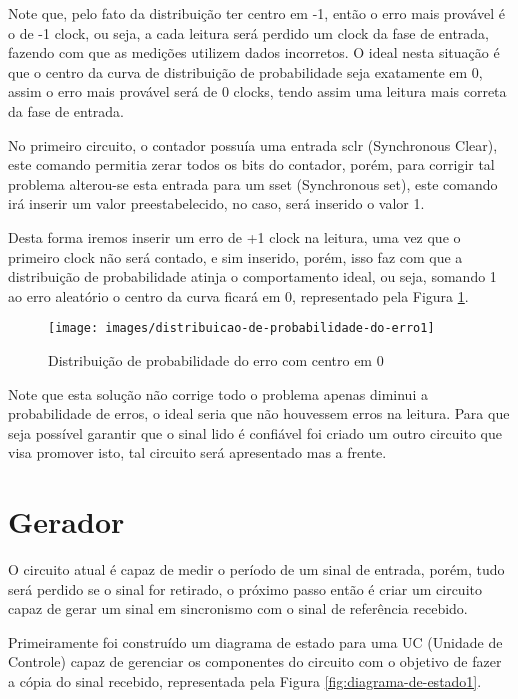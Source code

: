 \documentclass[12pt,a4paper,openany]{abntex2}
\begin{document}
Note que, pelo fato da distribuição ter centro em -1, então o erro mais provável é o de -1 clock, ou seja, a cada leitura será perdido um clock da fase de entrada, fazendo com que as medições utilizem dados incorretos. O ideal nesta situação é que o centro da curva de distribuição de probabilidade seja exatamente em 0, assim o erro mais provável será de 0 clocks, tendo assim uma leitura mais correta da fase de entrada.

No primeiro circuito, o contador possuía uma entrada sclr (Synchronous Clear), este comando permitia zerar todos os bits do contador, porém, para corrigir tal problema alterou-se esta entrada para um sset (Synchronous set), este comando irá inserir um valor preestabelecido, no caso, será inserido o valor 1.

Desta forma iremos inserir um erro de +1 clock na leitura, uma vez que o primeiro clock não será contado, e sim inserido, porém, isso faz com que a distribuição de probabilidade atinja o comportamento ideal, ou seja, somando 1 ao erro aleatório o centro da curva ficará em 0, representado pela Figura \ref{fig:distribuicao-de-probabilidade-do-erro1}.

\begin{figure}[!htp]
	\centering
	\caption{Distribuição de probabilidade do erro com centro em 0}
	\texttt{[image: images/distribuicao-de-probabilidade-do-erro1]}
	\label{fig:distribuicao-de-probabilidade-do-erro1}
\end{figure}

Note que esta solução não corrige todo o problema apenas diminui a probabilidade de erros, o ideal seria que não houvessem erros na leitura. Para que seja possível garantir que o sinal lido é confiável foi criado um outro circuito que visa promover isto, tal circuito será apresentado mas a frente.

\section{Gerador}

O circuito atual é capaz de medir o período de um sinal de entrada, porém, tudo será perdido se o sinal for retirado, o próximo passo então é criar um circuito capaz de gerar um sinal em sincronismo com o sinal de referência recebido. 

Primeiramente foi construído um diagrama de estado para uma UC (Unidade de Controle) capaz de gerenciar os componentes do circuito com o objetivo de fazer a cópia do sinal recebido, representada pela Figura \ref{fig:diagrama-de-estado1}.
\end{document}
